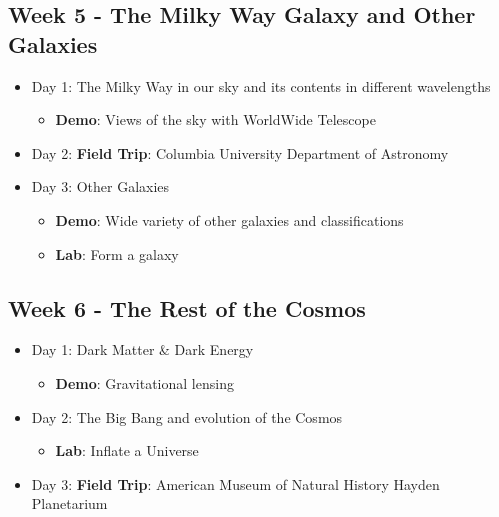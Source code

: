 \subsection*{Week 5 - The Milky Way Galaxy and Other Galaxies}
\begin{itemize}
\item Day 1: The Milky Way in our sky and its contents in different wavelengths
	\begin{itemize}
	\item \textbf{Demo}: Views of the sky with WorldWide Telescope
	\end{itemize}
\item Day 2: \textbf{Field Trip}: Columbia University Department of Astronomy

\item Day 3: Other Galaxies 
	\begin{itemize}
	\item \textbf{Demo}: Wide variety of other galaxies and classifications
	\item \textbf{Lab}: Form a galaxy
	\end{itemize}
\end{itemize}

\subsection*{Week 6 - The Rest of the Cosmos}
\begin{itemize}
\item Day 1: Dark Matter \& Dark Energy
	\begin{itemize}
	\item \textbf{Demo}: Gravitational lensing
	\end{itemize}
\item Day 2: The Big Bang and evolution of the Cosmos
	\begin{itemize}
	\item \textbf{Lab}: Inflate a Universe
	\end{itemize}
\item Day 3: \textbf{Field Trip}: American Museum of Natural History Hayden Planetarium 

\end{itemize}
